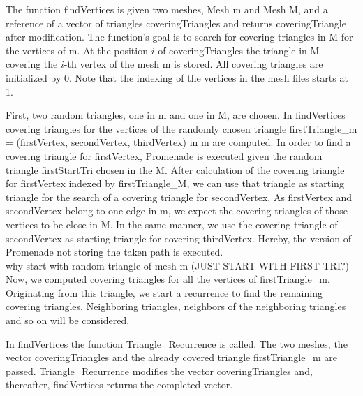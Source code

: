 \documentclass[10pt]{article}
\begin{document}
The function {\ttfamily findVertices} is given two meshes, {\ttfamily Mesh m} and {\ttfamily Mesh M}, and a reference of a vector of triangles {\ttfamily coveringTriangles} and returns {\ttfamily coveringTriangle} after modification. The function's goal is to search for covering triangles in {\ttfamily M} for the vertices of {\ttfamily  m}. At the position $i$ of {\ttfamily coveringTriangles} the triangle in {\ttfamily M} covering the $i$-th vertex of the mesh {\ttfamily m} is stored. All covering triangles are initialized by 0. Note that the indexing of the vertices in the mesh files starts at 1.

First, two random triangles, one in {\ttfamily m} and one in {\ttfamily M}, are chosen. In {\ttfamily findVertices} covering triangles for the vertices of the randomly chosen triangle {\ttfamily firstTriangle\_m = (firstVertex, secondVertex, thirdVertex)} in {\ttfamily m} are computed. In order to find a covering triangle for {\ttfamily firstVertex}, {\ttfamily Promenade} is executed given the random triangle {\ttfamily firstStartTri} chosen in the {\ttfamily M}. After calculation of the covering triangle for {\ttfamily firstVertex} indexed by {\ttfamily firstTriangle\_M}, we can use that triangle as starting triangle for the search of a covering triangle for {\ttfamily secondVertex}. As {\ttfamily firstVertex} and {\ttfamily secondVertex} belong to one edge in {\ttfamily m}, we expect the covering triangles of those vertices to be close in {\ttfamily M}. In the same manner, we use the covering triangle of {\ttfamily secondVertex} as starting triangle for covering {\ttfamily thirdVertex}. Hereby, the version of {\ttfamily Promenade} not storing the taken path is executed.\\

why start with random triangle of mesh m (JUST START WITH FIRST TRI?)\\

Now, we computed covering triangles for all the vertices of {\ttfamily firstTriangle\_m}. Originating from this triangle, we start a recurrence to find the remaining covering triangles. Neighboring triangles, neighbors of the neighboring triangles and so on will be considered.

In {\ttfamily findVertices} the function {\ttfamily Triangle\_Recurrence} is called. The two meshes, the vector {\ttfamily coveringTriangles} and the already covered triangle {\ttfamily firstTriangle\_m} are passed. {\ttfamily Triangle\_Recurrence} modifies the vector {\ttfamily coveringTriangles} and, thereafter, {\ttfamily findVertices} returns the completed vector.
\end{document}
